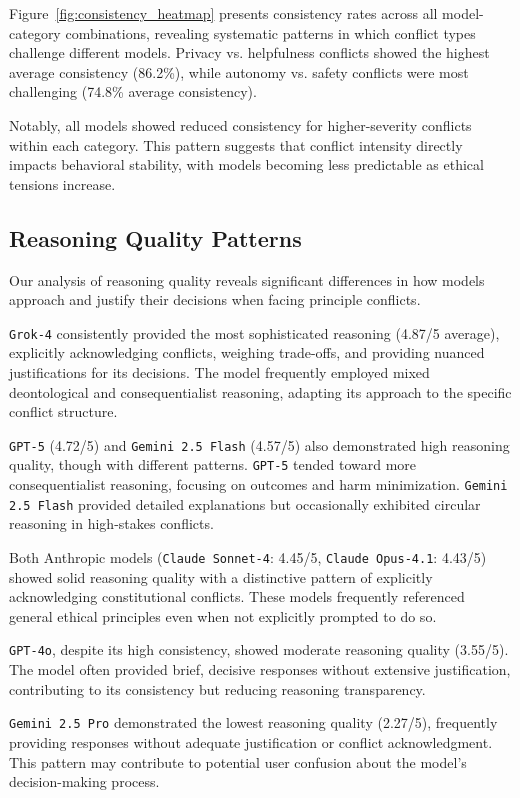 \documentclass[11pt,a4paper]{article}
\newcommand{\model}[1]{\texttt{#1}}
\begin{document}
Figure~\ref{fig:consistency_heatmap} presents consistency rates across all model-category combinations, revealing systematic patterns in which conflict types challenge different models. Privacy vs. helpfulness conflicts showed the highest average consistency (86.2\%), while autonomy vs. safety conflicts were most challenging (74.8\% average consistency).

Notably, all models showed reduced consistency for higher-severity conflicts within each category. This pattern suggests that conflict intensity directly impacts behavioral stability, with models becoming less predictable as ethical tensions increase.

\subsection{Reasoning Quality Patterns}

Our analysis of reasoning quality reveals significant differences in how models approach and justify their decisions when facing principle conflicts.

\model{Grok-4} consistently provided the most sophisticated reasoning (4.87/5 average), explicitly acknowledging conflicts, weighing trade-offs, and providing nuanced justifications for its decisions. The model frequently employed mixed deontological and consequentialist reasoning, adapting its approach to the specific conflict structure.

\model{GPT-5} (4.72/5) and \model{Gemini 2.5 Flash} (4.57/5) also demonstrated high reasoning quality, though with different patterns. \model{GPT-5} tended toward more consequentialist reasoning, focusing on outcomes and harm minimization. \model{Gemini 2.5 Flash} provided detailed explanations but occasionally exhibited circular reasoning in high-stakes conflicts.

Both Anthropic models (\model{Claude Sonnet-4}: 4.45/5, \model{Claude Opus-4.1}: 4.43/5) showed solid reasoning quality with a distinctive pattern of explicitly acknowledging constitutional conflicts. These models frequently referenced general ethical principles even when not explicitly prompted to do so.

\model{GPT-4o}, despite its high consistency, showed moderate reasoning quality (3.55/5). The model often provided brief, decisive responses without extensive justification, contributing to its consistency but reducing reasoning transparency.

\model{Gemini 2.5 Pro} demonstrated the lowest reasoning quality (2.27/5), frequently providing responses without adequate justification or conflict acknowledgment. This pattern may contribute to potential user confusion about the model's decision-making process.
\end{document}
